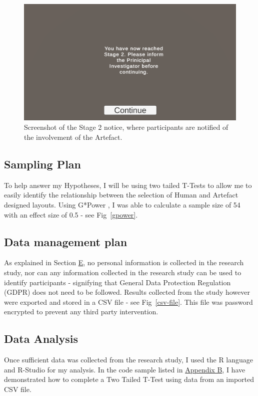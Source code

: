 \begin{figure}[!h]
    \includegraphics[width=\columnwidth]{./Images/stage-2-notice.png}
    \centering
    \caption{Screenshot of the Stage 2 notice, where participants are notified of the involvement of the Artefact.}
    \label{stage-2}
\end{figure}


\subsection{Sampling Plan}
To help answer my Hypotheses, I will be using two tailed T-Tests to allow me to easily identify the relationship between the selection of Human and Artefact designed layouts.
Using G*Power \cite{gpower}, I was able to calculate a sample size of 54 with an effect size of 0.5 - see Fig~\ref{gpower}.

\subsection{Data management plan}
As explained in Section \hyperref[ethics]{E}, no personal information is collected in the research study, nor can any information collected in the research study can be used to identify participants - signifying that General Data Protection Regulation (GDPR) \cite{gdpr} does not need to be followed. Results collected from the study however were exported and stored in a CSV file - see Fig~\ref{csv-file}. This file was password encrypted to prevent any third party intervention.


\subsection{Data Analysis}
Once sufficient data was collected from the research study, I used the R language and R-Studio for my analysis. In the code sample listed in \hyperref[append:b]{Appendix B}, I have demonstrated how to complete a Two Tailed T-Test using data from an imported CSV file.

